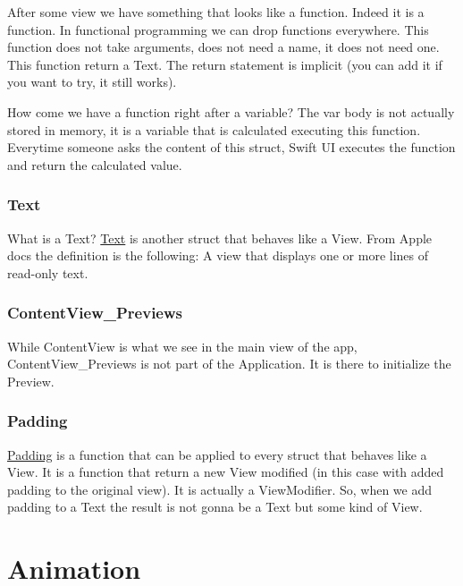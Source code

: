 \documentclass[]{article}
\begin{document}
After some view we have something that looks like a function. Indeed it
is a function. In functional programming we can drop functions
everywhere. This function does not take arguments, does not need a name,
it does not need one. This function return a Text. The return statement
is implicit (you can add it if you want to try, it still works).

How come we have a function right after a variable? The var body is not
actually stored in memory, it is a variable that is calculated executing
this function. Everytime someone asks the content of this struct, Swift
UI executes the function and return the calculated value.

\hypertarget{text}{%
\subsubsection{Text}\label{text}}

What is a Text?
\href{https://developer.apple.com/documentation/swiftui/text}{Text} is
another struct that behaves like a View. From Apple docs the definition
is the following: A view that displays one or more lines of read-only
text.

\hypertarget{contentview_previews}{%
\subsubsection{ContentView\_Previews}\label{contentview_previews}}

While ContentView is what we see in the main view of the app,
ContentView\_Previews is not part of the Application. It is there to
initialize the Preview.

\hypertarget{padding}{%
\subsubsection{Padding}\label{padding}}

\href{https://developer.apple.com/documentation/swiftui/text/padding(_:)-5wi61}{Padding}
is a function that can be applied to every struct that behaves like a
View. It is a function that return a new View modified (in this case
with added padding to the original view). It is actually a ViewModifier.
So, when we add padding to a Text the result is not gonna be a Text but
some kind of View.

\hypertarget{animation}{%
\section{Animation}\label{animation}}
\end{document}
